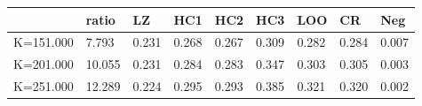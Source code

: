 \begin{table}[ht]
\centering
\begin{tabular}{rllllllll}
  \hline
 & ratio & LZ & HC1 & HC2 & HC3 & LOO & CR & Neg \\ 
  \hline
K=151.000 &  7.793 & 0.231 & 0.268 & 0.267 & 0.309 & 0.282 & 0.284 & 0.007 \\ 
  K=201.000 & 10.055 & 0.231 & 0.284 & 0.283 & 0.347 & 0.303 & 0.305 & 0.003 \\ 
  K=251.000 & 12.289 & 0.224 & 0.295 & 0.293 & 0.385 & 0.321 & 0.320 & 0.002 \\ 
   \hline
\end{tabular}
\end{table}
